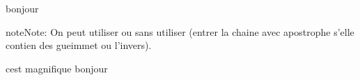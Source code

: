 \documentclass[letterpaper,10pt,french]{sphinxmanual}
\begin{document}
\begin{sphinxVerbatim}[commandchars=\\\{\}]
\end{sphinxVerbatim}

\begin{sphinxVerbatim}[commandchars=\\\{\}]
\PYGZdq{}bonjour\PYGZdq{}
\end{sphinxVerbatim}

\begin{sphinxadmonition}{note}{Note:}
\sphinxAtStartPar
On peut utiliser  ou  sans utiliser \sphinxcode{\sphinxupquote{\textbackslash{}}} (entrer la chaine avec apostrophe s’elle contien des gueimmet ou l’invers).
\end{sphinxadmonition}

\begin{sphinxVerbatim}[commandchars=\\\{\}]
\end{sphinxVerbatim}

\begin{sphinxVerbatim}[commandchars=\\\{\}]
c\PYGZsq{}est magnifique
\PYGZdq{}bonjour\PYGZdq{}
\end{sphinxVerbatim}
\end{document}
